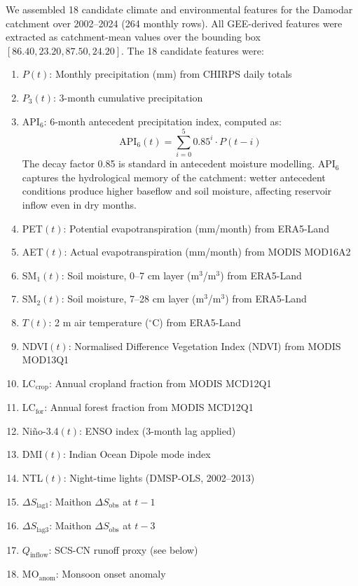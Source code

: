 \documentclass[12pt,a4paper,oneside]{report}
\newcommand{\dS}{\Delta S}
\newcommand{\dSobs}{\Delta S_{\mathrm{obs}}}
\begin{document}
We assembled 18 candidate climate and environmental features for the Damodar
catchment over 2002--2024 (264 monthly rows). All GEE-derived features were
extracted as catchment-mean values over the bounding box
$[86.40, 23.20, 87.50, 24.20]$. The 18 candidate features were:

\begin{enumerate}[leftmargin=*]
  \item $P(t)$: Monthly precipitation (mm) from CHIRPS daily totals
  \item $P_3(t)$: 3-month cumulative precipitation
  \item API$_6$: 6-month antecedent precipitation index, computed as:
    \begin{equation}
      \mathrm{API}_6(t) = \sum_{i=0}^{5} 0.85^i \cdot P(t-i)
      \label{eq:api6}
    \end{equation}
    The decay factor 0.85 is standard in antecedent moisture modelling. API$_6$
    captures the hydrological memory of the catchment: wetter antecedent
    conditions produce higher baseflow and soil moisture, affecting reservoir
    inflow even in dry months.
  \item PET$(t)$: Potential evapotranspiration (mm/month) from ERA5-Land
  \item AET$(t)$: Actual evapotranspiration (mm/month) from MODIS MOD16A2
  \item SM$_1(t)$: Soil moisture, 0--7 cm layer (m$^3$/m$^3$) from ERA5-Land
  \item SM$_2(t)$: Soil moisture, 7--28 cm layer (m$^3$/m$^3$) from ERA5-Land
  \item $T(t)$: 2 m air temperature ($^\circ$C) from ERA5-Land
  \item NDVI$(t)$: Normalised Difference Vegetation Index (NDVI) from MODIS MOD13Q1
  \item LC$_{\text{crop}}$: Annual cropland fraction from MODIS MCD12Q1
  \item LC$_{\text{for}}$: Annual forest fraction from MODIS MCD12Q1
  \item Ni\~{n}o-3.4$(t)$: ENSO index (3-month lag applied)
  \item DMI$(t)$: Indian Ocean Dipole mode index
  \item NTL$(t)$: Night-time lights (DMSP-OLS, 2002--2013)
  \item $\dS_{\text{lag1}}$: Maithon $\dSobs$ at $t-1$
  \item $\dS_{\text{lag3}}$: Maithon $\dSobs$ at $t-3$
  \item $Q_{\text{inflow}}$: SCS-CN runoff proxy (see below)
  \item MO$_{\text{anom}}$: Monsoon onset anomaly
\end{enumerate}
\end{document}
